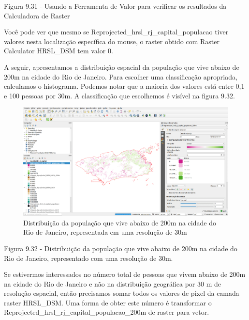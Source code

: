 \documentclass[
]{krantz}
\begin{document}
Figura 9.31 - Usando a Ferramenta de Valor para verificar os resultados da Calculadora de Raster

Você pode ver que mesmo se Reprojected\_hrsl\_rj\_capital\_populacao tiver valores nesta localização específica do mouse, o raster obtido com Raster Calculator HRSL\_DSM tem valor 0.

A seguir, apresentamos a distribuição espacial da população que vive abaixo de 200m na \hspace{0pt}\hspace{0pt}cidade do Rio de Janeiro. Para escolher uma classificação apropriada, calculamos o histograma. Podemos notar que a maioria dos valores está entre 0,1 e 100 pessoas por 30m. A classificação que escolhemos é visível na figura 9.32.

\begin{figure}
\centering
\includegraphics{media/modulo9/fig932.png}
\caption{Distribuição da população que vive abaixo de 200m na \hspace{0pt}\hspace{0pt}cidade do Rio de Janeiro, representada em uma resolução de 30m}
\end{figure}

Figura 9.32 - Distribuição da população que vive abaixo de 200m na \hspace{0pt}\hspace{0pt}cidade do Rio de Janeiro, representado com uma resolução de 30m.

Se estivermos interessados \hspace{0pt}\hspace{0pt}no número total de pessoas que vivem abaixo de 200m na \hspace{0pt}\hspace{0pt}cidade do Rio de Janeiro e não na distribuição geográfica por 30 m de resolução espacial, então precisamos somar todos os valores de pixel da camada raster HRSL\_DSM. Uma forma de obter este número é transformar o Reprojected\_hrsl\_rj\_capital\_populacao\_200m de raster para vetor.
\end{document}
